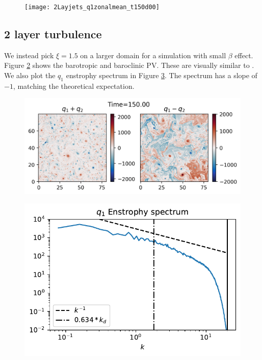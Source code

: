 \begin{figure}
    \centering
    \texttt{[image: 2Layjets\_q1zonalmean\_t150d00]}
    \caption{}
    \label{fig:2Layjets_q1zonalmean_t150d00}
\end{figure}

\subsection{2 layer turbulence}
We instead pick $\xi=1.5$ on a larger domain for a simulation with small $\beta$ effect. Figure \ref{fig:2Lay_qbrbc_t150d00} shows the barotropic and baroclinic PV. These are visually similar to \cite[Fig. 3]{LarichevHeld_95}. We also plot the $q_1$ enstrophy spectrum in Figure \ref{fig:2Lay_q1spec_t150d00}. The spectrum has a slope of $-1$, matching the theoretical expectation.

\begin{figure}
    \centering
    \includegraphics{plot_snap/figs/2Lay_qbrbc_t150d00}
    \caption{}
    \label{fig:2Lay_qbrbc_t150d00}
\end{figure}

\begin{figure}
    \centering
    \includegraphics{plot_snap/figs/2Lay_q1spec_t150d00}
    \caption{}
    \label{fig:2Lay_q1spec_t150d00}
\end{figure}
